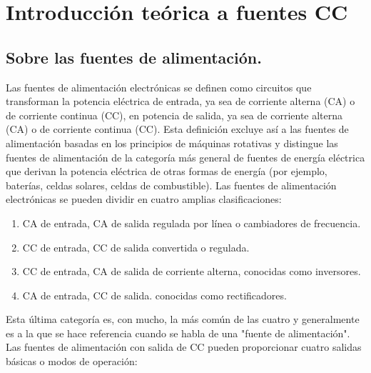 
\chapter{Introducción teórica a fuentes CC}

\label{C:Fuentes de corriente continua}

\section{Sobre las fuentes de alimentación.} \par
Las fuentes de alimentación electrónicas se definen como circuitos que transforman la potencia eléctrica de entrada, ya sea de corriente alterna (CA) o de corriente continua (CC), en potencia de salida, ya sea de corriente alterna (CA) o de corriente continua (CC). Esta definición excluye así a las fuentes de alimentación basadas en los principios de máquinas rotativas y distingue las fuentes de alimentación de la categoría más general de fuentes de energía eléctrica que derivan la potencia eléctrica de otras formas de energía (por ejemplo, baterías, celdas solares, celdas de combustible). Las fuentes de alimentación electrónicas se pueden dividir en cuatro amplias clasificaciones:

\begin{enumerate}
    \item CA de entrada, CA de salida regulada por línea o cambiadores de frecuencia.
    \item CC de entrada, CC de salida convertida o regulada.
    \item CC de entrada, CA de salida de corriente alterna, conocidas como inversores.
    \item CA de entrada, CC de salida. conocidas como rectificadores.
\end{enumerate}

Esta última categoría es, con mucho, la más común de las cuatro y generalmente es a la que se hace referencia cuando se habla de una "fuente de alimentación". Las fuentes de alimentación con salida de CC pueden proporcionar cuatro salidas básicas o modos de operación:

